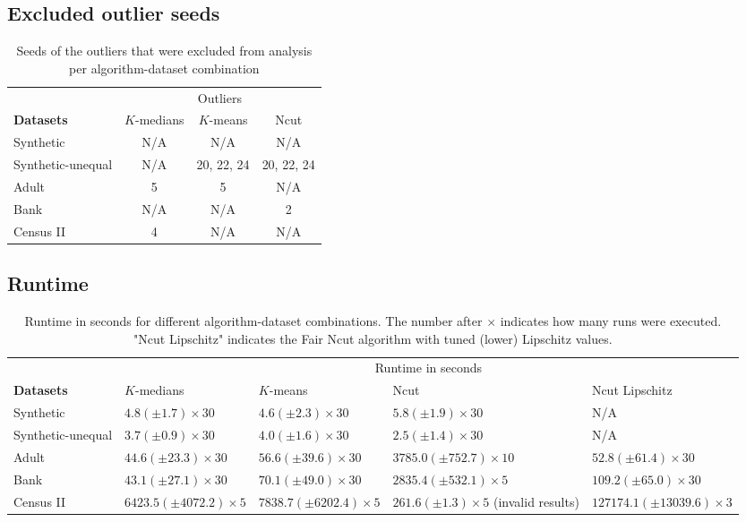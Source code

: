 \subsection*{Excluded outlier seeds}

\begin{table}[H]
    \centering
    \begin{tabular}{|l|c|c|c|}
        \hline
            & \multicolumn{3}{c|}{Outliers} \\
            \cline{2-4}
        \textbf{Datasets} & $K$-medians & $K$-means & Ncut \\ 
	\cline{2-4}
        \hline
        Synthetic & N/A & N/A & N/A \\
	Synthetic-unequal & N/A & 20, 22, 24 & 20, 22, 24 \\
	Adult & 5 & 5 & N/A \\
	Bank & N/A & N/A & 2 \\
	Census II & 4 & N/A & N/A \\
        \hline
    \end{tabular}
    \caption{Seeds of the outliers that were excluded from analysis per algorithm-dataset combination}
    \label{tab:outliers}
\end{table}

\subsection*{Runtime}

\begin{table}[H]
\small 
    \centering
    \begin{tabular}{|m{1.5cm}|m{2.5cm}|m{2.5cm}|m{2.5cm}|m{2.5cm}}
        \hline
            & \multicolumn{4}{c|}{Runtime in seconds} \\
            \cline{2-5}
        \textbf{Datasets} & $K$-medians & $K$-means & Ncut & Ncut Lipschitz \\ 
	\cline{2-5}
        \hline
        Synthetic & $4.8 (\pm1.7) \times 30$ & $4.6 (\pm2.3) \times 30$ & $5.8 (\pm1.9) \times 30$ & N/A \\
	Synthetic-unequal & $3.7 (\pm0.9) \times 30$ & $4.0 (\pm1.6) \times 30$ & $2.5 (\pm1.4) \times 30$ & N/A \\
	Adult & $44.6 (\pm23.3) \times 30$ & $56.6 (\pm39.6) \times 30$ & $3785.0 (\pm752.7) \times 10$ & $52.8 (\pm61.4) \times 30$ \\
	Bank & $43.1 (\pm27.1) \times 30$ & $70.1 (\pm49.0) \times 30$ & $2835.4 (\pm532.1) \times 5$ & $109.2 (\pm65.0) \times 30$ \\
	Census II & $6423.5 (\pm4072.2) \times 5$ & $7838.7 (\pm6202.4) \times 5$ & $261.6 (\pm1.3) \times 5$ (invalid results) & $127174.1 (\pm13039.6) \times 3$ \\
        \hline
    \end{tabular}
    \caption{Runtime in seconds for different algorithm-dataset combinations. The number after $\times$ indicates how many runs were executed. "Ncut Lipschitz" indicates the Fair Ncut algorithm with tuned (lower) Lipschitz values.}
    \label{tab:runtime}
\end{table}


